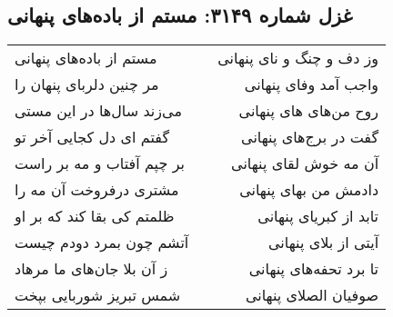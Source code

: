 \begin{center}
\section*{غزل شماره ۳۱۴۹: مستم از باده‌های پنهانی}
\label{sec:3149}
\begin{longtable}{l p{0.5cm} r}
مستم از باده‌های پنهانی
&&
وز دف و چنگ و نای پنهانی
\\
مر چنین دلربای پنهان را
&&
واجب آمد وفای پنهانی
\\
می‌زند سال‌ها در این مستی
&&
روح من‌های های پنهانی
\\
گفتم ای دل کجایی آخر تو
&&
گفت در برج‌های پنهانی
\\
بر چپم آفتاب و مه بر راست
&&
آن مه خوش لقای پنهانی
\\
مشتری درفروخت آن مه را
&&
دادمش من بهای پنهانی
\\
ظلمتم کی بقا کند که بر او
&&
تابد از کبریای پنهانی
\\
آتشم چون بمرد دودم چیست
&&
آیتی از بلای پنهانی
\\
ز آن بلا جان‌های ما مرهاد
&&
تا برد تحفه‌های پنهانی
\\
شمس تبریز شوربایی بپخت
&&
صوفیان الصلای پنهانی
\\
\end{longtable}
\end{center}
